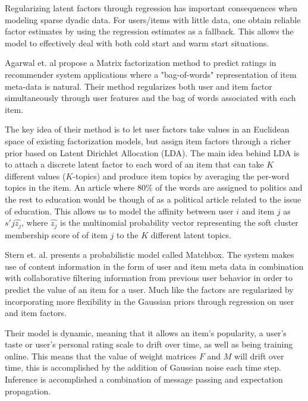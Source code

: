 Regularizing latent factors through regression has important consequences when modeling sparse dyadic data. For users/items with little data, one obtain reliable factor estimates by using the regression estimates as a fallback. This allows the model to effectively deal with both cold start and warm start situations.

%

Agarwal et. al \cite{Agarwal2010} propose a Matrix factorization method to predict ratings in recommender system
applications where a "bag-of-words" representation of item meta-data is natural. Their method regularizes both user and item factor simultaneously through user features and the bag of words associated with each item.

The key idea of their method is to let user factors take values in an Euclidean space of existing factorization models, but assign item factors through a richer prior based on Latent Dirichlet Allocation (LDA). The main idea behind LDA is to attach a discrete latent factor to each word of an item that can take $K$ different values ($K$-topics) and produce item topics by averaging the per-word topics in the item. An article where 80$\%$ of the words are assigned to politics and the rest to education would be though of as a political article related to the issue of education. This allows us to model the affinity between user $i$ and item $j$ as $s'{j}\hat{z_{j}}$, where $\hat{z_{j}}$ is the multinomial probability vector representing the soft cluster membership score of of item $j$ to the $K$ different latent topics. 


Stern et. al. \cite{Stern2009} presents a probabilistic model called Matchbox. The system makes use of content information in the form of user and
item meta data in combination with collaborative filtering information from previous user behavior in order to predict the value of an item for a user. Much like \cite{Agarwal2009} the factors are regularized by incorporating more flexibility in the Gaussian priors through regression on user and item factors.

Their model is dynamic, meaning that it allows an item's popularity, a user's taste or user's personal rating scale to drift over time, as well as being training online. This means that the value of weight matrices $F$ and $M$ will drift over time, this is accomplished by the addition of Gaussian noise each time step. Inference is accomplished a combination of message passing and expectation propagation.

